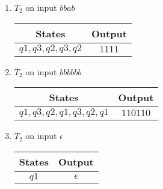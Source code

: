 \begin{enumerate}
\begin{enumerate}
\begin{table}[H]
                    \end{table}
              \item $T_2$ on input $bbab$
                    \begin{table}[H]
                        \centering
                        \begin{tabular}{|c|c|}
                            \hline
                            States           & Output \\
                            \hline
                            $q1,q3,q2,q3,q2$ & $1111$ \\
                            \hline
                        \end{tabular}
                    \end{table}
              \item $T_2$ on input $bbbbbb$
                    \begin{table}[H]
                        \centering
                        \begin{tabular}{|c|c|}
                            \hline
                            States                 & Output   \\
                            \hline
                            $q1,q3,q2,q1,q3,q2,q1$ & $110110$ \\
                            \hline
                        \end{tabular}
                    \end{table}
              \item $T_2$ on input $\epsilon$
                    \begin{table}[H]
                        \centering
                        \begin{tabular}{|c|c|}
                            \hline
                            States & Output     \\
                            \hline
                            $q1$   & $\epsilon$ \\
                            \hline
                        \end{tabular}
                    \end{table}
          \end{enumerate}
\end{enumerate}
